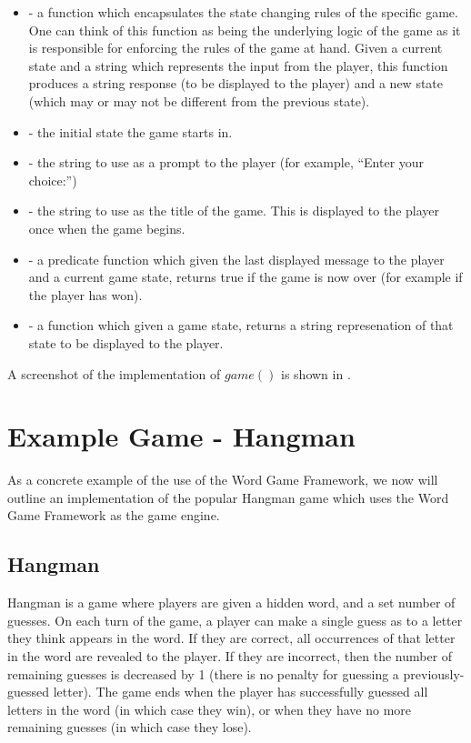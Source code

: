 \begin{itemize}
	\item {} - a function which encapsulates the state changing rules of the specific game.  One can think of this function as being the underlying logic of the game as it is responsible for enforcing the rules of the game at hand.  Given a current state and a string which represents the input from the player, this function produces a string response (to be displayed to the player) and a new state (which may or may not be different from the previous state).
	\item {} - the initial state the game starts in.
	\item {} - the string to use as a prompt to the player (for example, ``Enter your choice:'')
	\item {} - the string to use as the title of the game.  This is displayed to the player once when the game begins.
	\item {} - a predicate function which given the last displayed message to the player and a current game state, returns true if the game is now over (for example if the player has won).
	\item {} - a function which given a game state, returns a string represenation of that state to be displayed to the player.
\end{itemize}

A screenshot of the implementation of \(game()\) is shown in .


\section{Example Game - Hangman}
\label{hangmanImplDetails}

As a concrete example of the use of the Word Game Framework, we now will outline an implementation of the popular Hangman game which uses the Word Game Framework as the game engine.

\subsection{Hangman}

Hangman is a game where players are given a hidden word, and a set number of guesses.  On each turn of the game, a player can make a single guess as to a letter they think appears in the word.  If they are correct, all occurrences of that letter in the word are revealed to the player.  If they are incorrect, then the number of remaining guesses is decreased by 1 (there is no penalty for guessing a previously-guessed letter).  The game ends when the player has successfully guessed all letters in the word (in which case they win), or when they have no more remaining guesses (in which case they lose).

